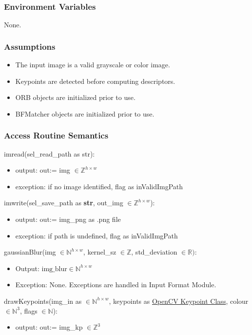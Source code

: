 \documentclass[12pt, titlepage]{article}
\begin{document}
\subsubsection{Environment Variables}
None.

\subsubsection{Assumptions}
\begin{itemize}
    \item The input image is a valid grayscale or color image.
    \item Keypoints are detected before computing descriptors.
    \item ORB objects are initialized prior to use.
    \item BFMatcher objects are initialized prior to use.
\end{itemize}

\subsubsection{Access Routine Semantics}

\noindent imread(sel\_read\_path as str):
\begin{itemize}
\item output: out:= img $\in \mathbb{Z}^{h \times w}$
\item exception: if no image identified, flag as inValidImgPath 
\end{itemize}

\noindent imwrite(sel\_save\_path as \textbf{str}, out\_img 
$\in \mathbb{Z}^{h \times w}$):
\begin{itemize}
\item output: out:= img\_png as .png file
\item exception: if path is undefined, flag as inValidImgPath 
\end{itemize}

\noindent gaussianBlur(img $\in \mathbb{N}^{h \times w}$, kernel\_sz $\in \mathbb{Z}$, std\_deviation $\in \mathbb{R})$:
\begin{itemize}
    \item Output: $\text{img\_blur} \in \mathbb{N}^{h \times w}$
    \item Exception: None. Exceptions are handled in Input Format Module.
\end{itemize}

\noindent drawKeypoints(img\_in as $\in \mathbb{N}^{h \times w}$, 
keypoints as \href{https://docs.opencv.org/3.4/d2/d29/classcv_1_1KeyPoint.html}{OpenCV Keypoint Class},
colour $\in \mathbb{N}^{3}$, flags $\in \mathbb{N}$):
\begin{itemize}
\item output: out:= img\_kp $\in \mathbb{Z}^{3}$
\end{itemize}
\end{document}
